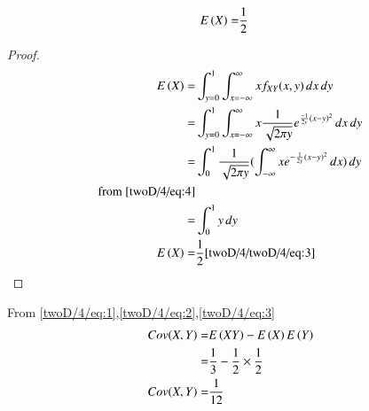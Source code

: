 \begin{lemma}
\begin{align}
  E\left(X\right)=&\frac{1}{2}   
\end{align}
\end{lemma}
\begin{proof}
\begin{align}
 E\left(X\right)=&\int_{y=0}^{1}\int_{x=-\infty}^{\infty}x f_{XY}(x,y)\,dx\,dy\\
    =&\int_{y=0}^{1}\int_{x=-\infty}^{\infty}x\frac{1}{\sqrt{2\pi y}}e^{\frac{-1}{2y}(x-y)^2}\,dx \,dy\\
     =&\int_{0}^{1}\frac{1}{\sqrt{2\pi y}}(\int_{-\infty}^{\infty}xe^{-\frac{1}{2y}(x-y)^2}\,dx)\,dy\\
     \text{from \eqref{twoD/4/eq:4}}\\
    =&\int_{0}^{1}y\,dy\\
E\left(X\right)=&\frac{1}{2} \ref{twoD/4/twoD/4/eq:3}
\end{align}
\end{proof}
From \eqref{twoD/4/eq:1},\eqref{twoD/4/eq:2},\eqref{twoD/4/eq:3}
\begin{align}
Cov(X,Y)=&E\left(XY\right)-E\left(X\right)E\left(Y\right)\\
       =&\frac{1}{3}-\frac{1}{2}\times \frac{1}{2}\\
Cov(X,Y)=&\frac{1}{12}
\end{align}